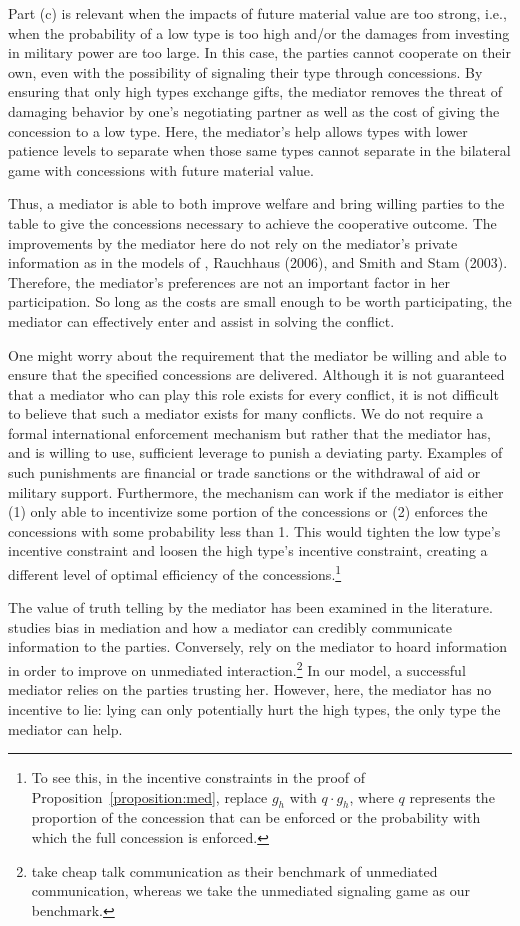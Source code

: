 \documentclass[bibtex,autowc]{apsr_submission}
\begin{document}
Part (c) is relevant when the impacts of future material value are too strong, i.e., when the probability of a low type is too high and/or the damages from investing in military power are too large. In this case, the parties cannot cooperate on their own, even with the possibility of signaling their type through concessions. By ensuring that only high types exchange gifts, the mediator removes the threat of damaging behavior by one's negotiating partner as well as the cost of giving the concession to a low type. Here, the mediator's help allows types with lower patience levels to separate when those same types cannot separate in the bilateral game with concessions with future material value.

Thus, a mediator is able to both improve welfare and bring willing parties to the table to give the concessions necessary to achieve the cooperative outcome. The improvements by the mediator here do not rely on the mediator's private information as in the models of \cite{kydd2003}, Rauchhaus (2006), and Smith and Stam (2003). Therefore, the mediator's preferences are not an important factor in her participation. So long as the costs are small enough to be worth participating, the mediator can effectively enter and assist in solving the conflict.

One might worry about the requirement that the mediator be willing and able to ensure that the specified concessions are delivered. Although it is not guaranteed that a mediator who can play this role exists for every conflict, it is not difficult to believe that such a mediator exists for many conflicts. We do not require a formal international enforcement mechanism but rather that the mediator has, and is willing to use, sufficient leverage to punish a deviating party. Examples of such punishments are financial or trade sanctions or the withdrawal of aid or military support. Furthermore, the mechanism can work if the mediator is either (1) only able to incentivize some portion of the concessions or (2) enforces the concessions with some probability less than 1. This would tighten the low type's incentive constraint and loosen the high type's incentive constraint, creating a different level of optimal efficiency of the concessions.\footnote{To see this, in the incentive constraints in the proof of Proposition~\ref{proposition:med}, replace $g_h$ with $q \cdot g_h$, where $q$ represents the proportion of the concession that can be enforced or the probability with which the full concession is enforced.} 

The value of truth telling by the mediator has been examined in the literature. \cite{kydd2003} studies bias in mediation and how a mediator can credibly communicate information to the parties. Conversely, \cite{horner2010} rely on the mediator to hoard information in order to improve on unmediated interaction.\footnote{\cite{horner2010} take cheap talk communication as their benchmark of unmediated communication, whereas we take the unmediated signaling game as our benchmark.} In our model, a successful mediator relies on the parties trusting her. However, here, the mediator has no incentive to lie: lying can only potentially hurt the high types, the only type the mediator can help.
\end{document}
